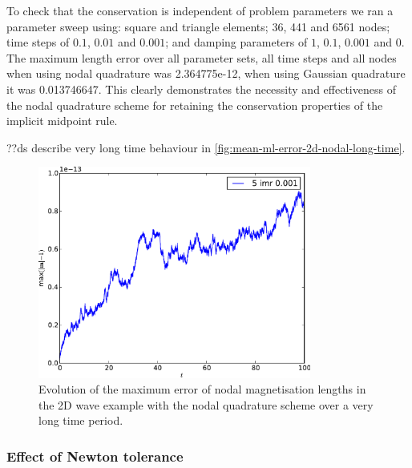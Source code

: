 To check that the conservation is independent of problem parameters we ran a parameter sweep using: square and triangle elements; 36, 441 and 6561 nodes; time steps of $0.1$, $0.01$ and $0.001$; and damping parameters of $1$, $0.1$, $0.001$ and $0$.
The maximum length error over all parameter sets, all time steps and all nodes when using nodal quadrature was 2.364775e-12, when using Gaussian quadrature it was 0.013746647.
This clearly demonstrates the necessity and effectiveness of the nodal quadrature scheme for retaining the conservation properties of the implicit midpoint rule.


??ds describe very long time behaviour in \autoref{fig:mean-ml-error-2d-nodal-long-time}.

\begin{figure}
  \centering
  \includegraphics[width=0.8\textwidth]{plots/2d_wave_solution_m_length_long_time/-maxmathbfm-1vst.pdf}
  \caption{Evolution of the maximum error of nodal magnetisation lengths in the 2D wave example with the nodal quadrature scheme over a very long time period.}
  \label{fig:mean-ml-error-2d-nodal-long-time}
\end{figure}



\subsubsection{Effect of Newton tolerance}
\label{sec:effect-newt-toler-m-conservation}

